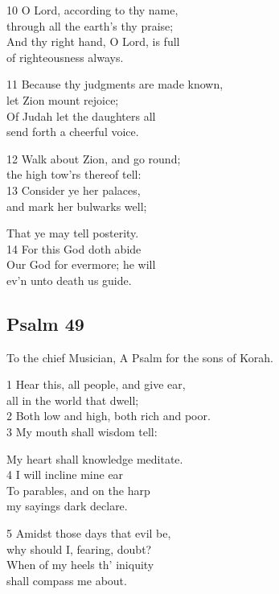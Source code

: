 \begin{multicols}{3}
10 O Lord, according to thy name,\\
through all the earth’s thy praise;\\
And thy right hand, O Lord, is full\\
of righteousness always.

11 Because thy judgments are made known,\\
let Zion mount rejoice;\\
Of Judah let the daughters all\\
send forth a cheerful voice.

12 Walk about Zion, and go round;\\
the high tow’rs thereof tell:\\
13 Consider ye her palaces,\\
and mark her bulwarks well;

That ye may tell posterity.\\
14 For this God doth abide\\
Our God for evermore; he will\\
ev’n unto death us guide.

\begin{center}
\quad{}\quad{}
\end{center}

\subsection*{Psalm 49}

To the chief Musician,
A Psalm for the sons of Korah.

1 Hear this, all people, and give ear,\\
all in the world that dwell;\\
2 Both low and high, both rich and poor.\\
3 My mouth shall wisdom tell:

My heart shall knowledge meditate.\\
4 I will incline mine ear\\
To parables, and on the harp\\
my sayings dark declare.

5 Amidst those days that evil be,\\
why should I, fearing, doubt?\\
When of my heels th’ iniquity\\
shall compass me about.


\end{multicols}
